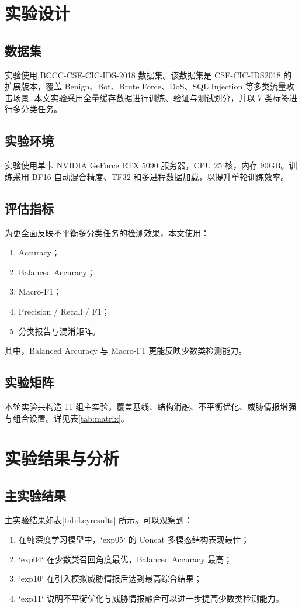 \documentclass[UTF8,a4paper,12pt]{ctexart}
\begin{document}
\section{实验设计}
\subsection{数据集}
实验使用 BCCC-CSE-CIC-IDS-2018 数据集。该数据集是 CSE-CIC-IDS2018 的扩展版本，覆盖 Benign、Bot、Brute Force、DoS、SQL Injection 等多类流量攻击场景\cite{sharafaldin2018toward,bcccids2018}. 本文实验采用全量缓存数据进行训练、验证与测试划分，并以 7 类标签进行多分类任务。

\subsection{实验环境}
实验使用单卡 NVIDIA GeForce RTX 5090 服务器，CPU 25 核，内存 90GB。训练采用 BF16 自动混合精度、TF32 和多进程数据加载，以提升单轮训练效率。

\subsection{评估指标}
为更全面反映不平衡多分类任务的检测效果，本文使用：
\begin{enumerate}[leftmargin=2em]
    \item Accuracy；
    \item Balanced Accuracy；
    \item Macro-F1；
    \item Precision / Recall / F1；
    \item 分类报告与混淆矩阵。
\end{enumerate}
其中，Balanced Accuracy 与 Macro-F1 更能反映少数类检测能力。

\subsection{实验矩阵}
本轮实验共构造 11 组主实验，覆盖基线、结构消融、不平衡优化、威胁情报增强与组合设置。详见表\ref{tab:matrix}。



\section{实验结果与分析}
\subsection{主实验结果}
主实验结果如表\ref{tab:keyresults} 所示。可以观察到：
\begin{enumerate}[leftmargin=2em]
    \item 在纯深度学习模型中，`exp05` 的 Concat 多模态结构表现最佳；
    \item `exp04` 在少数类召回角度最优，Balanced Accuracy 最高；
    \item `exp10` 在引入模拟威胁情报后达到最高综合结果；
    \item `exp11` 说明不平衡优化与威胁情报融合可以进一步提高少数类检测能力。
\end{enumerate}
\end{document}
